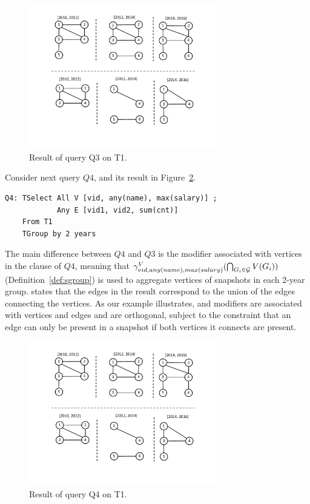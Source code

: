\begin{figure}
\includegraphics[width=3.2in]{figs/TGroupAny.pdf}
\caption{Result of query Q3 on T1.}
\label{fig:q3}
\end{figure}

Consider next query $Q4$, and its result in
Figure~\ref{fig:tg_all_any}.

\begin{small}
\begin{verbatim}
Q4: TSelect All V [vid, any(name), max(salary)] ; 
            Any E [vid1, vid2, sum(cnt)] 
    From T1 
    TGroup by 2 years
\end{verbatim}
\end{small}

The main difference between $Q4$ and $Q3$ is the  modifier
associated with vertices in the  clause of $Q4$,
meaning that $\gamma^{V}_{vid, any(name), max(salary)}(\bigcap_{G_i
  \in {\cal G}} V(G_i))$ (Definition~\ref{def:sgroup}) is used to
aggregate vertices of snapshots in each 2-year group.  
states that the edges in the result correspond to the union of the
edges connecting the vertices.  As our example illustrates,
 and  modifiers are associated with vertices and
edges and are orthogonal, subject to the constraint that an edge can
only be present in a snapshot if both vertices it connects are
present.

\begin{figure}
\includegraphics[width=3.2in]{figs/TGroupAllAny.pdf}
\caption{Result of query Q4 on T1.}
\label{fig:tg_all_any}
\end{figure}

